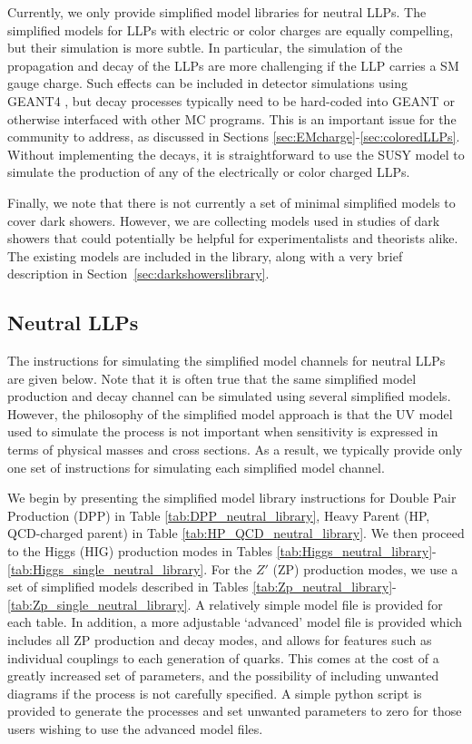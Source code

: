 Currently, we only provide simplified model libraries for neutral LLPs. The simplified models for LLPs with electric or color charges are equally compelling, but their simulation is more subtle. In particular, the simulation of the propagation and decay of the LLPs are more challenging if the LLP carries a SM gauge charge. Such effects can be included in detector simulations using GEANT4 \cite{Agostinelli:2002hh}, but decay processes typically need to be hard-coded into GEANT or otherwise interfaced with other MC programs. This is an important issue for the community to address, as discussed in Sections \ref{sec:EMcharge}-\ref{sec:coloredLLPs}. Without implementing the decays, it is straightforward to use the SUSY model to simulate the production of any of the electrically or color charged LLPs.

Finally, we note that there is not currently a set of minimal simplified models to cover dark showers. However, we are collecting models used in studies of dark showers that could potentially be helpful for experimentalists and theorists alike. The existing models are included in the library, along with a very brief description in Section~\ref{sec:darkshowerslibrary}.

\subsection{Neutral LLPs}

The instructions for simulating the simplified model channels for neutral LLPs are given below. Note that it is often true that the same simplified model production and decay channel can be simulated using several simplified models. However, the philosophy of the simplified model approach is that the UV model used to simulate the process is not important when sensitivity is expressed in terms of physical masses and cross sections. As a result, we typically  provide only one set of instructions for simulating each simplified model channel.

We begin by presenting the simplified model library instructions for Double Pair Production (DPP) in Table \ref{tab:DPP_neutral_library}, Heavy Parent (HP, QCD-charged parent) in Table \ref{tab:HP_QCD_neutral_library}. We then proceed to the Higgs (HIG) production modes in Tables \ref{tab:Higgs_neutral_library}-\ref{tab:Higgs_single_neutral_library}. For the $Z'$ (ZP) production modes, we use a set of simplified models described in Tables \ref{tab:Zp_neutral_library}-\ref{tab:Zp_single_neutral_library}. 
A relatively simple model file is provided for each table. In addition, a more adjustable `advanced' model file is provided which includes all ZP production and decay modes, and allows for features such as individual couplings to each generation of quarks. This comes at the cost of a greatly increased set of parameters, and the possibility of including unwanted diagrams if the process is not carefully specified. A simple python script is provided to generate the processes and set unwanted parameters to zero for those users wishing to use the advanced model files.


